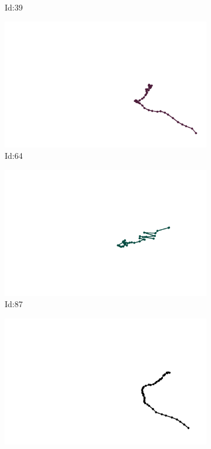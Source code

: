 \documentclass[12pt,twoside]{report}
\begin{document}
\begin{figure}
\begin{subfigure}[b]{0.20\textwidth}
\caption{Id:39}
\end{subfigure}
\begin{subfigure}[b]{0.20\textwidth}
\centering
\includegraphics[width=\textwidth]{../trajectories/64.png}
\caption{Id:64}
\end{subfigure}
\begin{subfigure}[b]{0.20\textwidth}
\centering
\includegraphics[width=\textwidth]{../trajectories/87.png}
\caption{Id:87}
\end{subfigure}
\begin{subfigure}[b]{0.20\textwidth}
\centering
\includegraphics[width=\textwidth]{../trajectories/105.png}

\end{subfigure}
\end{figure}
\end{document}
